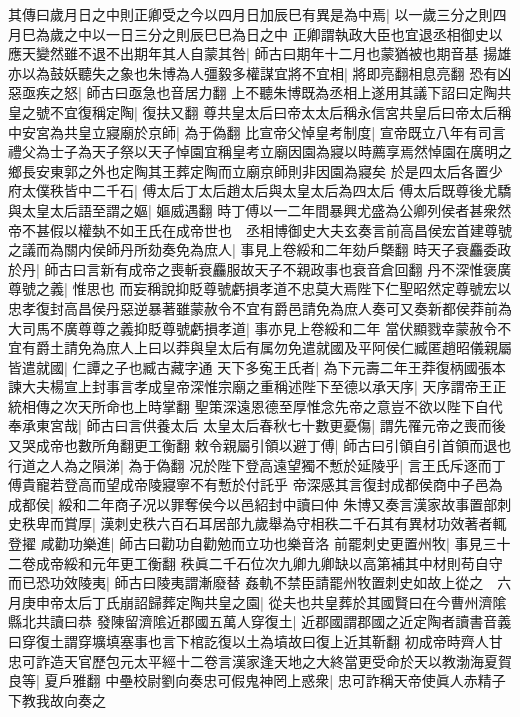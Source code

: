 其傳曰歲月日之中則正卿受之今以四月日加辰巳有異是為中焉|{
	以一歲三分之則四月巳為歲之中以一日三分之則辰巳巳為日之中}
正卿謂執政大臣也宜退丞相御史以應天變然雖不退不出期年其人自蒙其咎|{
	師古曰期年十二月也蒙猶被也期音基}
揚雄亦以為鼓妖聽失之象也朱博為人彊毅多權謀宜將不宜相|{
	將即亮翻相息亮翻}
恐有凶惡亟疾之怒|{
	師古曰亟急也音居力翻}
上不聽朱博既為丞相上遂用其議下詔曰定陶共皇之號不宜復稱定陶|{
	復扶又翻}
尊共皇太后曰帝太太后稱永信宮共皇后曰帝太后稱中安宮為共皇立寢廟於京師|{
	為于偽翻}
比宣帝父悼皇考制度|{
	宣帝既立八年有司言禮父為士子為天子祭以天子悼園宜稱皇考立廟因園為寢以時薦享焉然悼園在廣明之鄉長安東郭之外也定陶其王葬定陶而立廟京師則非因園為寢矣}
於是四太后各置少府太僕秩皆中二千石|{
	傅太后丁太后趙太后與太皇太后為四太后}
傅太后既尊後尤驕與太皇太后語至謂之嫗|{
	嫗威遇翻}
時丁傅以一二年間暴興尤盛為公卿列侯者甚衆然帝不甚假以權埶不如王氏在成帝世也　丞相博御史大夫玄奏言前高昌侯宏首建尊號之議而為關内侯師丹所劾奏免為庶人|{
	事見上卷綏和二年劾戶槩翻}
時天子衰麤委政於丹|{
	師古曰言新有成帝之喪斬衰麤服故天子不親政事也衰音倉回翻}
丹不深惟褒廣尊號之義|{
	惟思也}
而妄稱說抑貶尊號虧損孝道不忠莫大焉陛下仁聖昭然定尊號宏以忠孝復封高昌侯丹惡逆暴著雖蒙赦令不宜有爵邑請免為庶人奏可又奏新都侯莽前為大司馬不廣尊尊之義抑貶尊號虧損孝道|{
	事亦見上卷綏和二年}
當伏顯戮幸蒙赦令不宜有爵土請免為庶人上曰以莽與皇太后有属勿免遣就國及平阿侯仁臧匿趙昭儀親屬皆遣就國|{
	仁譚之子也臧古藏字通}
天下多寃王氏者|{
	為下元壽二年王莽復柄國張本}
諫大夫楊宣上封事言孝成皇帝深惟宗廟之重稱述陛下至德以承天序|{
	天序謂帝王正統相傳之次天所命也上時掌翻}
聖策深遠恩德至厚惟念先帝之意豈不欲以陛下自代奉承東宮哉|{
	師古曰言供養太后}
太皇太后春秋七十數更憂傷|{
	謂先罹元帝之喪而後又哭成帝也數所角翻更工衡翻}
敕令親屬引領以避丁傅|{
	師古曰引領自引首領而退也}
行道之人為之隕涕|{
	為于偽翻}
况於陛下登高遠望獨不慙於延陵乎|{
	言王氏斥逐而丁傅貴寵若登高而望成帝陵寢寧不有慙於付託乎}
帝深感其言復封成都侯商中子邑為成都侯|{
	綏和二年商子况以罪奪侯今以邑紹封中讀曰仲}
朱博又奏言漢家故事置部刺史秩卑而賞厚|{
	漢刺史秩六百石耳居部九歲舉為守相秩二千石其有異材功效著者輒登擢}
咸勸功樂進|{
	師古曰勸功自勸勉而立功也樂音洛}
前罷刺史更置州牧|{
	事見三十二卷成帝綏和元年更工衡翻}
秩眞二千石位次九卿九卿缺以高第補其中材則苟自守而已恐功效陵夷|{
	師古曰陵夷謂漸廢替}
姦軌不禁臣請罷州牧置刺史如故上從之　六月庚申帝太后丁氏崩詔歸葬定陶共皇之園|{
	從夫也共皇葬於其國賢曰在今曹州濟隂縣北共讀曰恭}
發陳留濟隂近郡國五萬人穿復土|{
	近郡國謂郡國之近定陶者讀書音義曰穿復土謂穿壙填塞事也言下棺訖復以土為墳故曰復上近其靳翻}
初成帝時齊人甘忠可詐造天官歷包元太平經十二卷言漢家逢天地之大終當更受命於天以教渤海夏賀良等|{
	夏戶雅翻}
中壘校尉劉向奏忠可假鬼神罔上惑衆|{
	忠可詐稱天帝使眞人赤精子下教我故向奏之}

